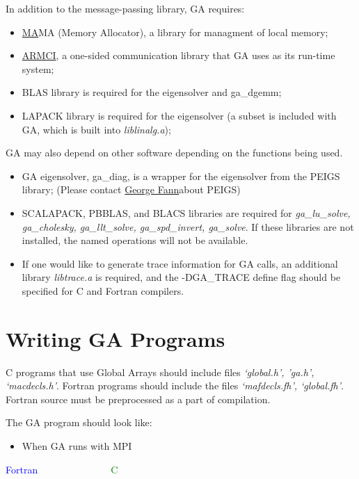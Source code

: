 In addition to the message-passing library, GA requires:
\begin{itemize}
\item \href{http://www.emsl.pnl.gov/docs/parsoft/ma/MAapi.html}{MA}MA (Memory
Allocator), a library for managment of local memory; 
\item \href{http://www.emsl.pnl.gov/docs/parsoft/armci}{ARMCI}, a one-sided
communication library that GA uses as its run-time system; 
\item BLAS library is required for the eigensolver and ga\_dgemm; 
\item LAPACK library is required for the eigensolver (a subset is included
with GA, which is built into \emph{liblinalg.a});
\end{itemize}
GA may also depend on other software depending on the functions being
used.
\begin{itemize}
\item GA eigensolver, ga\_diag, is a wrapper for the eigensolver from the
PEIGS library; (Please contact \href{mailto:fanngi@ornl.gov}{George Fann}about
PEIGS) 
\item SCALAPACK, PBBLAS, and BLACS libraries are required for \emph{ga\_lu\_solve,
ga\_cholesky, ga\_llt\_solve, ga\_spd\_invert, ga\_solve}. If these
libraries are not installed, the named operations will not be available. 
\item If one would like to generate trace information for GA calls, an additional
library \emph{libtrace.a} is required, and the -DGA\_TRACE define
flag should be specified for C and Fortran compilers.
\end{itemize}

\section{Writing GA Programs }

C programs that use Global Arrays should include files \emph{`global.h',
'ga.h', `macdecls.h'}. Fortran programs should include the files \emph{`mafdecls.fh',
`global.fh'}. Fortran source must be preprocessed as a part of compilation.

The GA program should look like:
\begin{itemize}
\item When GA runs with MPI\end{itemize}
\textcolor{blue}{Fortran~}~~~~~~~~~~~~~~\textcolor{green}{C}


